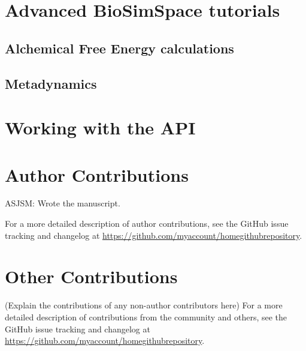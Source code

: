 \documentclass[9pt,tutorial]{livecoms}
\newcommand{\githubrepository}{\url{https://github.com/myaccount/homegithubrepository}}  %
\begin{document}
\section{Advanced BioSimSpace tutorials}
\label{sec:advanced_tutorial}

\subsection{Alchemical Free Energy calculations}

\subsection{Metadynamics}

\section{Working with the API}
\label{sec:API_tutorial}




\section*{Author Contributions}
ASJSM: Wrote the manuscript. 

For a more detailed description of author contributions,
see the GitHub issue tracking and changelog at \githubrepository.

\section*{Other Contributions}
%

(Explain the contributions of any non-author contributors here)
For a more detailed description of contributions from the community and others, see the GitHub issue tracking and changelog at \githubrepository.
\end{document}
